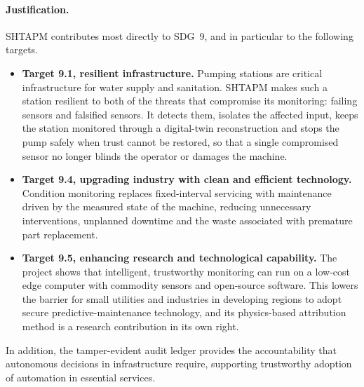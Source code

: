 \paragraph{Justification.} SHTAPM contributes most directly to SDG~9, and in particular to the following targets.

\begin{itemize}
  \item \textbf{Target 9.1, resilient infrastructure.} Pumping stations are critical infrastructure for water supply and sanitation. SHTAPM makes such a station resilient to both of the threats that compromise its monitoring: failing sensors and falsified sensors. It detects them, isolates the affected input, keeps the station monitored through a digital-twin reconstruction and stops the pump safely when trust cannot be restored, so that a single compromised sensor no longer blinds the operator or damages the machine.
  \item \textbf{Target 9.4, upgrading industry with clean and efficient technology.} Condition monitoring replaces fixed-interval servicing with maintenance driven by the measured state of the machine, reducing unnecessary interventions, unplanned downtime and the waste associated with premature part replacement.
  \item \textbf{Target 9.5, enhancing research and technological capability.} The project shows that intelligent, trustworthy monitoring can run on a low-cost edge computer with commodity sensors and open-source software. This lowers the barrier for small utilities and industries in developing regions to adopt secure predictive-maintenance technology, and its physics-based attribution method is a research contribution in its own right.
\end{itemize}

In addition, the tamper-evident audit ledger provides the accountability that autonomous decisions in infrastructure require, supporting trustworthy adoption of automation in essential services.
